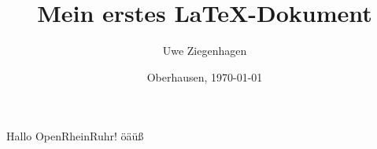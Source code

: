 \documentclass[ngerman]{article}
\author{Uwe Ziegenhagen}
\title{Mein erstes \LaTeX-Dokument}
\date{Oberhausen, \today}
\begin{document}
\maketitle

Hallo OpenRheinRuhr! öäüß
\end{document}

